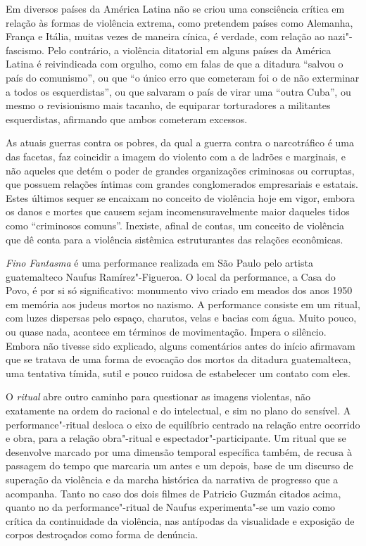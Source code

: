 Em diversos países da América Latina não se criou uma consciência
crítica em relação às formas de violência extrema, como pretendem países
como Alemanha, França e Itália, muitas vezes de maneira cínica, é
verdade, com relação ao nazi"-fascismo. Pelo contrário, a violência
ditatorial em alguns países da América Latina é reivindicada com
orgulho, como em falas de que a ditadura ``salvou o país do comunismo'',
ou que ``o único erro que cometeram foi o de não exterminar a todos os
esquerdistas'', ou que salvaram o país de virar uma ``outra Cuba'', ou
mesmo o revisionismo mais tacanho, de equiparar torturadores a
militantes esquerdistas, afirmando que ambos cometeram excessos.

As atuais guerras contra os pobres, da qual a guerra contra o
narcotráfico é uma das facetas, faz coincidir a imagem do violento com a
de ladrões e marginais, e não aqueles que detém o poder de grandes
organizações criminosas ou corruptas, que possuem relações íntimas com
grandes conglomerados empresariais e estatais. Estes últimos sequer se
encaixam no conceito de violência hoje em vigor, embora os danos e
mortes que causem sejam incomensuravelmente maior daqueles tidos como
``criminosos comuns''. Inexiste, afinal de contas, um conceito de
violência que dê conta para a violência sistêmica estruturantes das
relações econômicas.

\asterisc

\emph{Fino Fantasma} é uma performance realizada em São Paulo pelo
artista guatemalteco Naufus Ramírez"-Figueroa. O local da performance, a
Casa do Povo, é por si só significativo: monumento vivo criado em meados
dos anos 1950 em memória aos judeus mortos no nazismo. A performance
consiste em um ritual, com luzes dispersas pelo espaço, charutos, velas
e bacias com água. Muito pouco, ou quase nada, acontece em términos de
movimentação. Impera o silêncio. Embora não tivesse sido explicado,
alguns comentários antes do início afirmavam que se tratava de uma forma
de evocação dos mortos da ditadura guatemalteca, uma tentativa tímida,
sutil e pouco ruidosa de estabelecer um contato com eles.

O \emph{ritual} abre outro caminho para questionar as imagens violentas,
não exatamente na ordem do racional e do intelectual, e sim no plano do
sensível. A performance"-ritual desloca o eixo de equilíbrio centrado na
relação entre ocorrido e obra, para a relação obra"-ritual e
espectador"-participante. Um ritual que se desenvolve marcado por uma
dimensão temporal específica também, de recusa à passagem do tempo que
marcaria um antes e um depois, base de um discurso de superação da
violência e da marcha histórica da narrativa de progresso que a
acompanha. Tanto no caso dos dois filmes de Patricio Guzmán citados
acima, quanto no da performance"-ritual de Naufus experimenta"-se um vazio
como crítica da continuidade da violência, nas antípodas da visualidade
e exposição de corpos destroçados como forma de denúncia.

